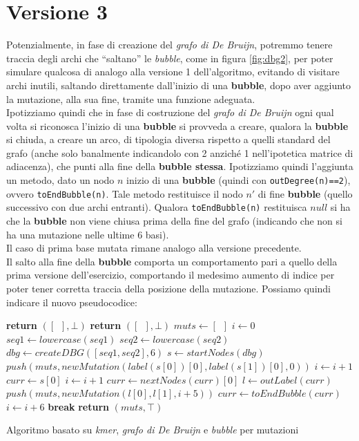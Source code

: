 \documentclass[a4paper,12pt, oneside]{book}
\begin{document}
\section{Versione 3}
Potenzialmente, in fase di creazione del \textit{grafo di De Bruijn}, potremmo
tenere traccia degli archi che ``saltano'' le \textit{bubble}, come in figura
\ref{fig:dbg2}, per poter simulare qualcosa di analogo alla versione 1
dell'algoritmo, evitando di visitare archi inutili, saltando direttamente
dall'inizio di una \textbf{bubble}, dopo aver aggiunto la mutazione, alla sua
fine, tramite una funzione adeguata. \\
Ipotizziamo quindi che in fase di costruzione del \textit{grafo di De Bruijn}
ogni qual volta si riconosca l'inizio di una \textbf{bubble} si provveda a
creare, qualora la \textbf{bubble} si chiuda, a creare un arco, di tipologia
diversa rispetto a quelli standard del grafo (anche solo banalmente indicandolo
con 2 anziché 1 nell'ipotetica matrice di adiacenza), che punti alla fine della
\textbf{bubble stessa}. Ipotizziamo quindi l'aggiunta un metodo, dato un
nodo $n$ inizio di una \textbf{bubble} (quindi con \texttt{outDegree(n)==2}),
ovvero 
\texttt{toEndBubble(n)}. Tale metodo restituisce il nodo $n'$ di fine
\textbf{bubble} (quello successivo con due archi entranti). Qualora
\texttt{toEndBubble(n)} restituisca $null$ si ha che la \textbf{bubble} non
viene chiusa prima della fine del grafo (indicando che non si ha una mutazione
nelle ultime 6 basi).\\
Il caso di prima base mutata rimane analogo alla versione precedente.\\
Il salto alla fine della \textbf{bubble} comporta un comportamento pari a quello
della prima versione dell'esercizio, comportando il medesimo aumento di indice
per poter tener corretta traccia della posizione della mutazione.
\newpage
Possiamo quindi indicare il nuovo pseudocodice:
\begin{algorithm}[H]
  \small
  \begin{algorithmic}[1]
    \State \textbf{return} $([\,\,\,],\bot)$
    \EndIf
    \State \textbf{return} $([\,\,\,],\bot)$
    \EndIf
    \State $muts \gets [\,\,\,]$
    \State $i\gets 0$
    \State $seq1\gets lowercase(seq1)$
    \State $seq2\gets lowercase(seq2)$
    \State $dbg\gets createDBG([seq1, seq2], 6)$
    \State $s \gets startNodes(dbg)$
    \State $push(muts, newMutation(label(s[0])[0], label(s[1])[0], 0))$ 
    \State $i\gets i+1$
    \EndIf
    \State $curr\gets s[0]$
    \While {$\top$}
    \State $i\gets i+1$
    \State $curr\gets nextNodes(curr)[0]$
    \Else
    \State $l\gets outLabel(curr)$
    \State $push(muts, newMutation(l[0], l[1], i+5))$
    \State $curr\gets toEndBubble(curr)$
    \State $i\gets i+6$
    \EndIf
    \State \textbf{break}
    \EndIf
    \EndWhile
    \State \textbf{return} $(muts, \top)$
    \EndFunction
  \end{algorithmic}
  \caption{Algoritmo basato su \textit{kmer}, \textit{grafo di De Bruijn} e
  \textit{bubble} per mutazioni} 
\end{algorithm}
\end{document}
